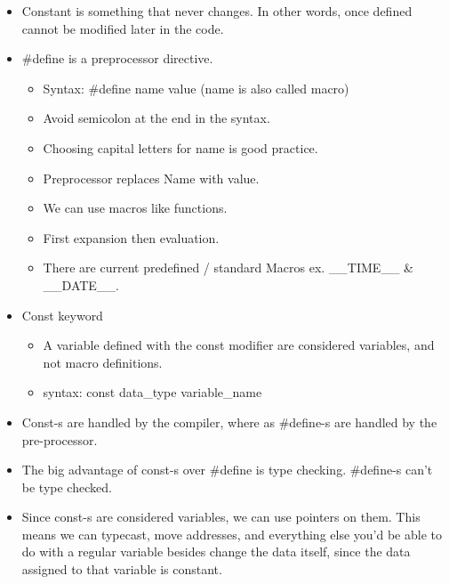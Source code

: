 \begin{itemize}
    \item Constant is something that never changes. In other words, once defined cannot be modified later in the code.
    \item \#define is a preprocessor directive.
    \begin{itemize}
        \item Syntax: \#define name value (name is also called macro)
        \item Avoid semicolon at the end in the syntax.
        \item Choosing capital letters for name is good practice.
        \item Preprocessor replaces Name with value.
        \item We can use macros like functions.
        \item First expansion then evaluation.
        \item There are current predefined / standard Macros ex. \_\_TIME\_\_ \& \_\_DATE\_\_.
    \end{itemize}
    \item Const keyword
    \begin{itemize}
        \item A variable defined with the const modifier are considered variables, and not macro definitions. 
        \item syntax: const data\_type variable\_name
    \end{itemize}
    \item Const-s are handled by the compiler, where as \#define-s are handled by the pre-processor.
    \item The big advantage of const-s over \#define is type checking. \#define-s can't be type checked.
    \item Since const-s are considered variables, we can use pointers on them. This means we can typecast, move addresses, and everything else you'd be able to do with a regular variable besides change the data itself, since the data assigned to that variable is constant.
\end{itemize}